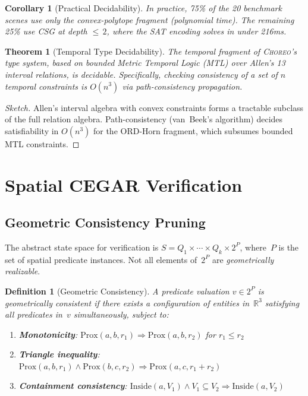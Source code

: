 \documentclass[11pt,a4paper]{article}
\newtheorem{theorem}{Theorem}
\newtheorem{definition}{Definition}
\newtheorem{corollary}{Corollary}
\begin{document}
\begin{corollary}[Practical Decidability]
In practice, 75\% of the 20 benchmark scenes use only the convex-polytope
fragment (polynomial time).
The remaining 25\% use CSG at depth ${\le}\,2$, where the SAT encoding
solves in under 216ms.
\end{corollary}

\begin{theorem}[Temporal Type Decidability]\label{thm:temporal-decidability}
The temporal fragment of \textsc{Choreo}'s type system, based on bounded
Metric Temporal Logic (MTL) over Allen's 13 interval relations, is decidable.
Specifically, checking consistency of a set of $n$ temporal constraints
is $O(n^3)$ via path-consistency propagation.
\end{theorem}

\begin{proof}[Sketch]
Allen's interval algebra with convex constraints forms a tractable subclass
of the full relation algebra.
Path-consistency (van~Beek's algorithm) decides satisfiability in
$O(n^3)$ for the ORD-Horn fragment, which subsumes bounded MTL constraints.
\end{proof}

\section{Spatial CEGAR Verification}\label{sec:cegar}

\subsection{Geometric Consistency Pruning}

The abstract state space for verification is
$S = Q_1 \times \cdots \times Q_k \times 2^P$,
where~$P$ is the set of spatial predicate instances.
Not all elements of~$2^P$ are \emph{geometrically realizable}.

\begin{definition}[Geometric Consistency]
A predicate valuation $v \in 2^P$ is \emph{geometrically consistent} if there
exists a configuration of entities in~$\mathbb{R}^3$ satisfying all predicates
in~$v$ simultaneously, subject to:
\begin{enumerate}
  \item \textbf{Monotonicity}: $\text{Prox}(a,b,r_1) \Rightarrow \text{Prox}(a,b,r_2)$
        for $r_1 \leq r_2$
  \item \textbf{Triangle inequality}: $\text{Prox}(a,b,r_1) \wedge \text{Prox}(b,c,r_2)
        \Rightarrow \text{Prox}(a,c,r_1{+}r_2)$
  \item \textbf{Containment consistency}: $\text{Inside}(a,V_1) \wedge V_1 \subseteq V_2
        \Rightarrow \text{Inside}(a,V_2)$
\end{enumerate}
\end{definition}
\end{document}
